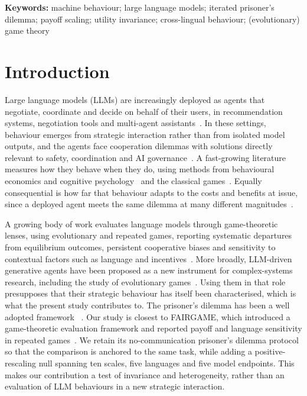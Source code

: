 \documentclass[11pt,a4paper]{article}
\newcommand{\rev}[1]{{\color{red}#1}}
\newcommand{\rev}[1]{#1}
\begin{document}
\noindent\textbf{Keywords:} machine behaviour; large language models; iterated prisoner's dilemma; payoff scaling; utility invariance; cross-lingual behaviour; (evolutionary) game theory


\section{Introduction}\label{sec:intro}

Large language models \rev{(LLMs)} are increasingly deployed as agents that
negotiate, coordinate and decide on behalf of their users, in recommendation
systems, negotiation tools and multi-agent
assistants~\cite{park2023generative,tessler2024ai,hammond2025multi,cook2024llm}.
In these settings, behaviour emerges from strategic interaction rather than from
isolated model outputs, and the agents face cooperation dilemmas with
solutions  directly relevant to  safety, coordination and AI
governance~\cite{dafoe2021cooperative,lu2024llms,han2026social,idowu2026mapping}.
A fast-growing literature measures how they behave when they do, using methods from behavioural economics and cognitive
psychology~\cite{binz2023using,horton2023large,aher2023using,rilla2026recognising} and  the
classical games~\cite{mei2024turing}. Equally consequential is how far that
behaviour adapts to the costs and benefits at issue, since a deployed agent
meets the same dilemma at many different magnitudes~\cite{hammond2025multi}.

A growing body of work evaluates language models through game-theoretic
lenses, using evolutionary and repeated games, reporting
systematic departures from equilibrium outcomes, persistent cooperative biases and
sensitivity to contextual factors such as language and
incentives~\cite{buscemi2025fairgame,sun2025gtllm_survey,mao2025alympics,pal2026strategiescooperationdefectionlarge,willis2025will,fan2024can,pires2025large,fu2026optimal,xie2026evolutionary}.
\rev{More broadly, LLM-driven generative agents have been proposed as a new
instrument for complex-systems research, including the study of evolutionary
games~\cite{lu2024llms,han2025llms,chen2025harnessing}. Using them in that role
presupposes that their strategic behaviour has itself been characterised,
which is what the present study contributes to.}
The prisoner's dilemma has been a well adopted framework ~\cite{axelrod1981evolution,axelrod1984evolution,nowak1992tit,nowak1993strategy,nowak2006five,pressDyson2012}.
Our study is closest to FAIRGAME, which introduced a game-theoretic
evaluation framework and reported payoff and language sensitivity in repeated
games~\cite{buscemi2025fairgame}. We retain its no-communication prisoner's
dilemma protocol so that the comparison is anchored to the same task, while
adding a positive-rescaling null spanning ten scales, five languages and five
model endpoints. This makes our
contribution a test of invariance and heterogeneity, rather than an evaluation of LLM behaviours in a new strategic interaction.
\end{document}
